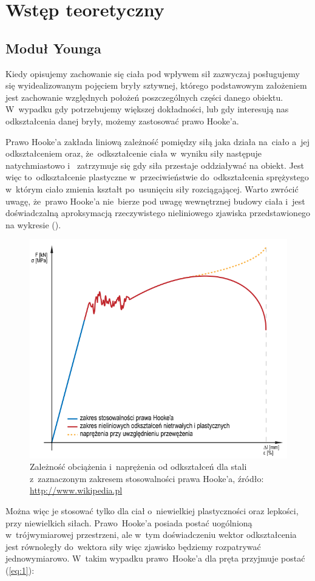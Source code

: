 \documentclass{fizraport}
\begin{document}
\maketitle
\section{Wstęp teoretyczny}
\subsection{Moduł Younga}
Kiedy opisujemy zachowanie się ciała pod wpływem sił zazwyczaj posługujemy się
wyidealizowanym pojęciem bryły sztywnej, którego podstawowym założeniem jest
zachowanie względnych położeń poszczególnych części danego obiektu. W~wypadku gdy
potrzebujemy większej dokładności, lub gdy interesują nas odkształcenia danej bryły, możemy
zastosować prawo Hooke’a.

Prawo Hooke’a zakłada liniową zależność pomiędzy siłą jaka działa na~ciało a~jej
odkształceniem oraz, że~odkształcenie ciała w~wyniku siły następuje natychmiastowo i~
zatrzymuje się gdy siła przestaje oddziaływać na obiekt. Jest więc to~odkształcenie plastyczne
w~przeciwieństwie do~odkształcenia sprężystego w~którym ciało zmienia kształt po~usunięciu
siły rozciągającej. Warto zwrócić uwagę, że~prawo Hooke’a nie~bierze pod uwagę
wewnętrznej budowy ciała i~jest doświadczalną aproksymacją rzeczywistego nieliniowego
zjawiska przedstawionego na wykresie ().

\begin{figure}[!htb]
	\centering
	\includegraphics[scale=0.45]{wstep.png}
	\caption{Zależność obciążenia i~naprężenia od odkształceń dla stali z~zaznaczonym zakresem stosowalności prawa Hooke’a, źródło:  \url{http://www.wikipedia.pl}}
	\label{fig:hook}
\end{figure}
\pagebreak
Można więc je stosować tylko dla ciał o~niewielkiej plastyczności oraz lepkości, przy niewielkich siłach. Prawo~Hooke’a posiada
postać uogólnioną w~trójwymiarowej przestrzeni, ale w~tym doświadczeniu wektor
odkształcenia jest równoległy do~wektora siły więc zjawisko będziemy rozpatrywać
jednowymiarowo. W~takim wypadku prawo~Hooke’a dla pręta przyjmuje postać (\ref{eq:1}):
\end{document}
